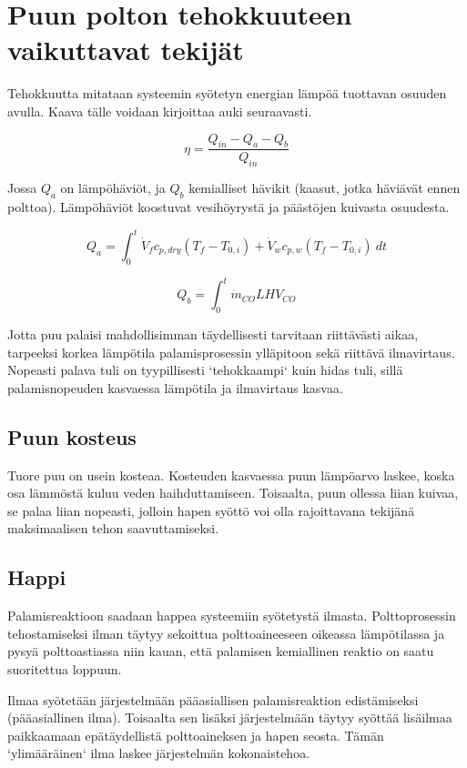 \section{Puun polton tehokkuuteen vaikuttavat tekijät}

Tehokkuutta mitataan systeemin syötetyn energian lämpöä tuottavan osuuden avulla.
Kaava tälle voidaan kirjoittaa auki seuraavasti.

\begin{equation}
	\eta=\frac{Q_{in}-Q_a-Q_b}{Q_{in}}
\end{equation}

\noindent
Jossa \(Q_a\) on lämpöhäviöt, ja \(Q_b\) kemialliset hävikit (kaasut, jotka häviävät ennen polttoa).
Lämpöhäviöt koostuvat vesihöyrystä ja päästöjen kuivasta osuudesta.

\begin{equation}
	Q_a=\int_0^t{
		\dot V_f c_{p,dry}(T_f-T_{0,i}) +
		\dot V_w c_{p,w}(T_f-T_{0,i})
	}\ dt
\end{equation}

\begin{equation}
	Q_b=\int_0^t{
		\dot m_{CO}LHV_{CO}
	}
\end{equation}

Jotta puu palaisi mahdollisimman täydellisesti tarvitaan riittävästi aikaa,
tarpeeksi korkea lämpötila palamisprosessin ylläpitoon sekä riittävä ilmavirtaus.
Nopeasti palava tuli on tyypillisesti `tehokkaampi` kuin hidas tuli, sillä palamisnopeuden
kasvaessa lämpötila ja ilmavirtaus kasvaa.

\subsection{Puun kosteus}
Tuore puu on usein kosteaa. Kosteuden kasvaessa puun lämpöarvo laskee,
koska osa lämmöstä kuluu veden haihduttamiseen.
Toisaalta, puun ollessa liian kuivaa, se palaa liian nopeasti,
jolloin hapen syöttö voi olla rajoittavana tekijänä maksimaalisen tehon saavuttamiseksi.

\subsection{Happi}
Palamisreaktioon saadaan happea systeemiin syötetystä ilmasta.
Polttoprosessin tehostamiseksi ilman täytyy sekoittua polttoaineeseen oikeassa lämpötilassa
ja pysyä polttoastiassa niin kauan, että palamisen kemiallinen reaktio on saatu
suoritettua loppuun.

Ilmaa syötetään järjestelmään pääasiallisen palamisreaktion edistämiseksi (pääasiallinen ilma).
Toisaalta sen lisäksi järjestelmään täytyy syöttää lisäilmaa paikkaamaan epätäydellistä
polttoaineksen ja hapen seosta. Tämän `ylimääräinen` ilma laskee järjestelmän
kokonaistehoa.
